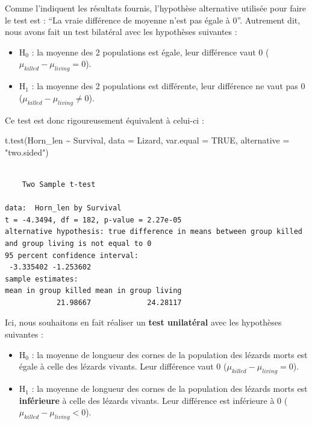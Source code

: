 \documentclass[
  french,
  a4paper,
  DIV=11,
  numbers=noendperiod,
  oneside]{scrreprt}
\newenvironment{Shaded}{}{}
\newcommand{\AttributeTok}[1]{\textcolor[rgb]{0.84,0.23,0.29}{#1}}
\newcommand{\ConstantTok}[1]{\textcolor[rgb]{0.00,0.36,0.77}{#1}}
\newcommand{\FunctionTok}[1]{\textcolor[rgb]{0.44,0.26,0.76}{#1}}
\newcommand{\NormalTok}[1]{\textcolor[rgb]{0.14,0.16,0.18}{#1}}
\newcommand{\SpecialCharTok}[1]{\textcolor[rgb]{0.00,0.36,0.77}{#1}}
\newcommand{\StringTok}[1]{\textcolor[rgb]{0.01,0.18,0.38}{#1}}
\providecommand{\tightlist}{%
  \setlength{\itemsep}{0pt}\setlength{\parskip}{0pt}}
\begin{document}
Comme l'indiquent les résultats fournis, l'hypothèse alternative
utilisée pour faire le test est : ``La vraie différence de moyenne n'est
pas égale à 0''. Autrement dit, nous avons fait un test bilatéral avec
les hypothèses suivantes :

\begin{itemize}
\tightlist
\item
  H\(_0\) : la moyenne des 2 populations est égale, leur différence vaut
  0 (\(\mu_{killed}-\mu_{living} = 0\)).
\item
  H\(_1\) : la moyenne des 2 populations est différente, leur différence
  ne vaut pas 0 (\(\mu_{killed}-\mu_{living} \neq 0\)).
\end{itemize}

Ce test est donc rigoureusement équivalent à celui-ci :

\begin{Shaded}
\begin{Highlighting}[]
\FunctionTok{t.test}\NormalTok{(Horn\_len }\SpecialCharTok{\textasciitilde{}}\NormalTok{ Survival, }\AttributeTok{data =}\NormalTok{ Lizard, }\AttributeTok{var.equal =} \ConstantTok{TRUE}\NormalTok{,}
       \AttributeTok{alternative =} \StringTok{"two.sided"}\NormalTok{)}
\end{Highlighting}
\end{Shaded}

\begin{verbatim}

    Two Sample t-test

data:  Horn_len by Survival
t = -4.3494, df = 182, p-value = 2.27e-05
alternative hypothesis: true difference in means between group killed and group living is not equal to 0
95 percent confidence interval:
 -3.335402 -1.253602
sample estimates:
mean in group killed mean in group living 
            21.98667             24.28117 
\end{verbatim}

Ici, nous souhaitons en fait réaliser un \textbf{test unilatéral} avec
les hypothèses suivantes :

\begin{itemize}
\tightlist
\item
  H\(_0\) : la moyenne de longueur des cornes de la population des
  lézards morts est égale à celle des lézards vivants. Leur différence
  vaut 0 (\(\mu_{killed}-\mu_{living} = 0\)).
\item
  H\(_1\) : la moyenne de longueur des cornes de la population des
  lézards morts est \textbf{inférieure} à celle des lézards vivants.
  Leur différence est inférieure à 0
  (\(\mu_{killed}-\mu_{living} < 0\)).
\end{itemize}
\end{document}
